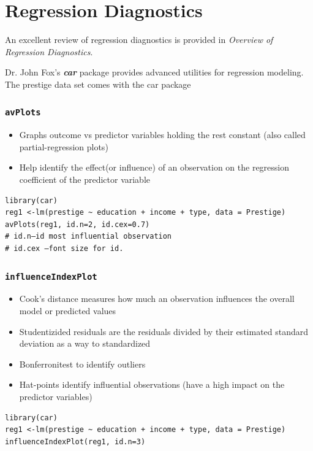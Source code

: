 \documentclass[residuals.tex]{subfiles}
\begin{document}
\section*{Regression Diagnostics}

An excellent review of regression diagnostics is provided in  \textit{Overview of Regression Diagnostics}. 

Dr. John Fox's \textbf{\textit{car}} package provides advanced utilities for regression modeling. The prestige data set comes with the car package

\subsubsection*{\texttt{avPlots}}
\begin{itemize}
\item Graphs outcome vs predictor variables holding the rest constant (also called partial-regression plots)
\item  Help identify the effect(or influence) of an observation on the regression coefficient of the predictor variable
\end{itemize}
\begin{framed}
\begin{verbatim}
library(car)
reg1 <-lm(prestige ~ education + income + type, data = Prestige)
avPlots(reg1, id.n=2, id.cex=0.7)
# id.n–id most influential observation
# id.cex –font size for id.
\end{verbatim}
\end{framed}
\subsubsection*{\texttt{influenceIndexPlot}}
\begin{itemize}
\item Cook's distance measures how much an observation influences the overall model or predicted values
\item  Studentizided residuals are the residuals divided by their estimated standard deviation as a way to standardized
\item  Bonferronitest to identify outliers
\item Hat-points identify influential observations (have a high impact on the predictor variables)
\end{itemize}
\begin{framed}
\begin{verbatim}
library(car)
reg1 <-lm(prestige ~ education + income + type, data = Prestige)
influenceIndexPlot(reg1, id.n=3)

\end{verbatim}
\end{framed}
\end{document}
